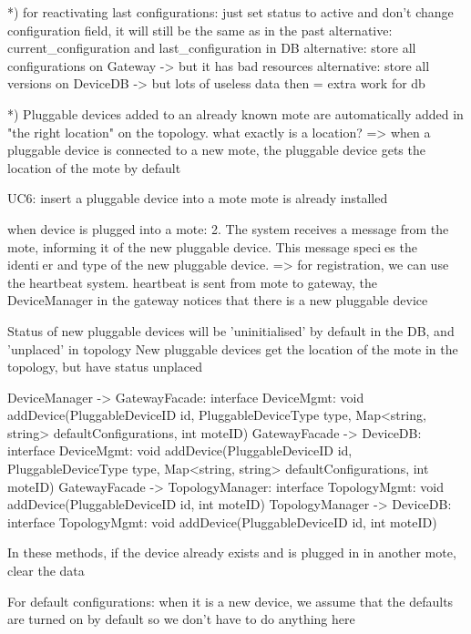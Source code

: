         *) for reactivating last configurations: just set status to active and don't change configuration field, it will still be the same as in the past
            alternative: current\_configuration and last\_configuration in DB
            alternative: store all configurations on Gateway -> but it has bad resources
            alternative: store all versions on DeviceDB -> but lots of useless data then = extra work for db

        *) Pluggable devices added to an already known mote are automatically added in "the right location" on the topology.
            what exactly is a location?
            => when a pluggable device is connected to a new mote, the pluggable device gets the location of the mote by default

        UC6: insert a pluggable device into a mote
            mote is already installed

            when device is plugged into a mote:
                2. The system receives a message from the mote, informing it of the new pluggable device. This
                message species the identier and type of the new pluggable device.
                => for registration, we can use the heartbeat system. heartbeat is sent from mote to gateway,
                the DeviceManager in the gateway notices that there is a new pluggable device

                Status of new pluggable devices will be 'uninitialised' by default in the DB, and 'unplaced' in topology
                New pluggable devices get the location of the mote in the topology, but have status unplaced

                DeviceManager -> GatewayFacade:   interface DeviceMgmt:   void addDevice(PluggableDeviceID id, PluggableDeviceType type, Map<string, string> defaultConfigurations, int moteID)
                GatewayFacade -> DeviceDB:        interface DeviceMgmt:   void addDevice(PluggableDeviceID id, PluggableDeviceType type, Map<string, string> defaultConfigurations, int moteID)
                GatewayFacade -> TopologyManager: interface TopologyMgmt: void addDevice(PluggableDeviceID id, int moteID)
                TopologyManager -> DeviceDB:      interface TopologyMgmt: void addDevice(PluggableDeviceID id, int moteID)

                In these methods, if the device already exists and is plugged in in another mote, clear the data

                For default configurations: when it is a new device, we assume that the defaults are turned on by default so we don't have to do anything here

